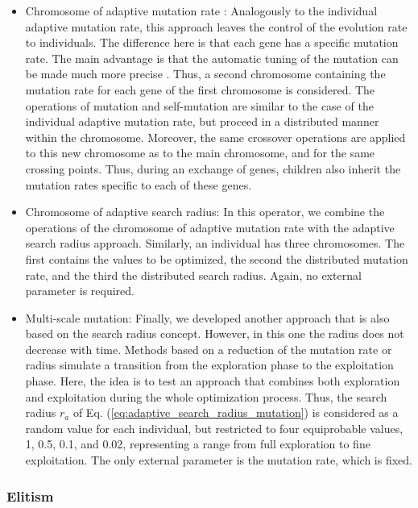 \documentclass{ametsoc}
\begin{document}
\begin{itemize}
	\item Chromosome of adaptive mutation rate \citep[or \textit{n adaptative mutation rate},][]{Back1992a}: Analogously to the individual adaptive mutation rate, this approach leaves the control of the evolution rate to individuals. The difference here is that each gene has a specific mutation rate. The main advantage is that the automatic tuning of the mutation can be made much more precise \citep{Smith1997a}. Thus, a second chromosome containing the mutation rate for each gene of the first chromosome is considered. The operations of mutation and self-mutation are similar to the case of the individual adaptive mutation rate, but proceed in a distributed manner within the chromosome. Moreover, the same crossover operations are applied to this new chromosome as to the main chromosome, and for the same crossing points. Thus, during an exchange of genes, children also inherit the mutation rates specific to each of these genes.
	
	\item Chromosome of adaptive search radius: In this operator, we combine the operations of the chromosome of adaptive mutation rate with the adaptive search radius approach. Similarly, an individual has three chromosomes. The first contains the values to be optimized, the second the distributed mutation rate, and the third the distributed search radius. Again, no external parameter is required.
	
	\item Multi-scale mutation: Finally, we developed another approach that is also based on the search radius concept. However, in this one the radius does not decrease with time. Methods based on a reduction of the mutation rate or radius simulate a transition from the exploration phase to the exploitation phase. Here, the idea is to test an approach that combines both exploration and exploitation during the whole optimization process. Thus, the search radius $r_{a}$ of Eq. (\ref{eq:adaptive_search_radius_mutation}) is considered as a random value for each individual, but restricted to four equiprobable values, 1, 0.5, 0.1, and 0.02, representing a range from full exploration to fine exploitation. The only external parameter is the mutation rate, which is fixed.
	
\end{itemize}


\subsubsection{Elitism}
\end{document}
